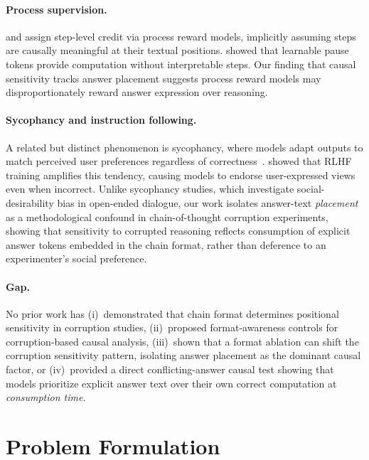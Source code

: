 \documentclass{article}
\theoremstyle{definition}
\theoremstyle{definition}
\begin{document}
\paragraph{Process supervision.}
\citet{lightman2023} and \citet{uesato2022} assign step-level credit
via process reward models, implicitly assuming steps are causally meaningful
at their textual positions. \citet{goyal2024} showed that learnable pause
tokens provide computation without interpretable steps. Our finding
that causal sensitivity tracks answer placement suggests process reward
models may disproportionately reward answer expression over reasoning.

\paragraph{Sycophancy and instruction following.}
A related but distinct phenomenon is sycophancy, where models adapt
outputs to match perceived user preferences regardless of
correctness~\citep{perez2023sycophancy,sharma2023sycophancy}.
\citet{sharma2023sycophancy} showed that RLHF training amplifies this
tendency, causing models to endorse user-expressed views even when
incorrect. Unlike sycophancy studies, which investigate social-desirability
bias in open-ended dialogue, our work isolates answer-text \emph{placement}
as a methodological confound in chain-of-thought corruption
experiments, showing that sensitivity to corrupted reasoning reflects
consumption of explicit answer tokens embedded in the chain format,
rather than deference to an experimenter's social preference.

\paragraph{Gap.} No prior work has (i)~demonstrated that chain format
determines positional sensitivity in corruption studies, (ii)~proposed
format-awareness controls for corruption-based causal analysis,
(iii)~shown that a format ablation can shift the corruption
sensitivity pattern, isolating answer placement as the dominant
causal factor, or (iv)~provided a direct conflicting-answer causal test
showing that models prioritize explicit answer text over their own
correct computation at \emph{consumption time}.

\section{Problem Formulation}
\label{sec:formulation}
\end{document}
